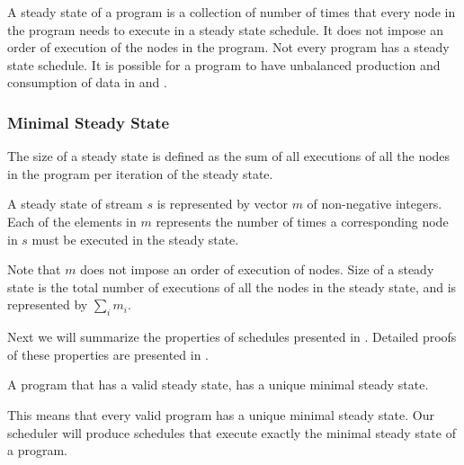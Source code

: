 A steady state of a program is a collection of number of times
that every node in the program needs to execute in a steady state
schedule.  It does not impose an order of execution of the nodes
in the program. Not every {\StreamIt} program has a steady state
schedule.  It is possible for a program to have unbalanced
production and consumption of data in {\splitjoins} and
{{\feedbackloops}}.
\begin{comment}
The amount of data buffered
continually increases, and cannot be reduced, thus making it
impossible to create a steady state schedule for them.  It is also
possible that a {{\feedbackloop}} does not have enough data buffered
up internally in order to complete execution of a full steady
state, and thus deadlocks. Programs without a valid steady state
schedule are not considered valid {\StreamIt} programs. In other
words, all valid {\StreamIt} programs have a steady state
schedule.
\end{comment}

\subsubsection{Minimal Steady State}

The size of a steady state is defined as the sum of all executions
of all the nodes in the program per iteration of the steady state.

\begin{definition}
A steady state of stream $s$ is represented by vector $m$ of
non-negative integers. Each of the elements in $m$ represents the
number of times a corresponding node in $s$ must be executed in
the steady state.
\end{definition}

Note that $m$ does not impose an order of execution of nodes. Size
of a steady state is the total number of executions of all the
nodes in the steady state, and is represented by $\sum_i m_i$.

Next we will summarize the properties of schedules presented in
\cite{lee87static}. Detailed proofs of these properties are
presented in \cite{karczma-thesis}.

\begin{theorem}
A {\StreamIt} program that has a valid steady state, has a unique
minimal steady state.
\end{theorem}

This means that every valid {\StreamIt} program has a unique minimal
steady state. Our scheduler will produce schedules that execute
exactly the minimal steady state of a program.

